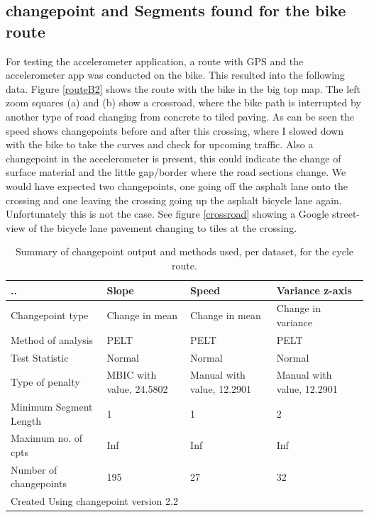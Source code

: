 \clearpage

\subsection{changepoint and Segments found for the bike route}
For testing the accelerometer application, a route with GPS and the accelerometer app was conducted on the bike. This resulted into the following data. Figure \ref{routeB2} shows the route with the bike in the big top map. The left zoom squares (a) and (b) show a crossroad, where the bike path is interrupted by another type of road changing from concrete to tiled paving. As can be seen the speed shows changepoints before and after this crossing, where I slowed down with the bike to take the curves and check for upcoming traffic. Also a changepoint in the accelerometer is present, this could indicate the change of surface material and the little gap/border where the road sections change. We would have expected two changepoints, one going off the asphalt lane onto the crossing and one leaving the crossing going up the asphalt bicycle lane again. Unfortunately this is not the case. See figure \ref{crossroad} showing a Google street-view of the bicycle lane pavement changing to tiles at the crossing.

\begin{table}[!hb]
\centering
\caption{Summary of changepoint output and methods used, per dataset, for the cycle route.}
\label{sss}
\begin{tabular}{|p{109pt}|p{85pt}|p{85pt}|p{85pt}|}
	\hline
	.. & Slope & Speed & Variance z-axis \\
	\hline 
	Changepoint type 	& Change in mean 	& Change in mean 	& Change in variance \\
	Method of analysis	& PELT 				& PELT 				& PELT\\
	Test Statistic 		& Normal 			& Normal 			& Normal\\
	Type of penalty		& MBIC with value, 24.5802 & Manual with value, 12.2901 & Manual with value, 12.2901\\
	Minimum Segment Length	& 1 			& 1 				& 2 \\
	Maximum no. of cpts 	& Inf 			& Inf 			& Inf \\
	Number of changepoints 	& 195			& 27 				& 32 \\
	\hline
	\multicolumn{4}{|l|}{Created Using changepoint version 2.2 } \\
	\hline
\end{tabular}
\end{table}

